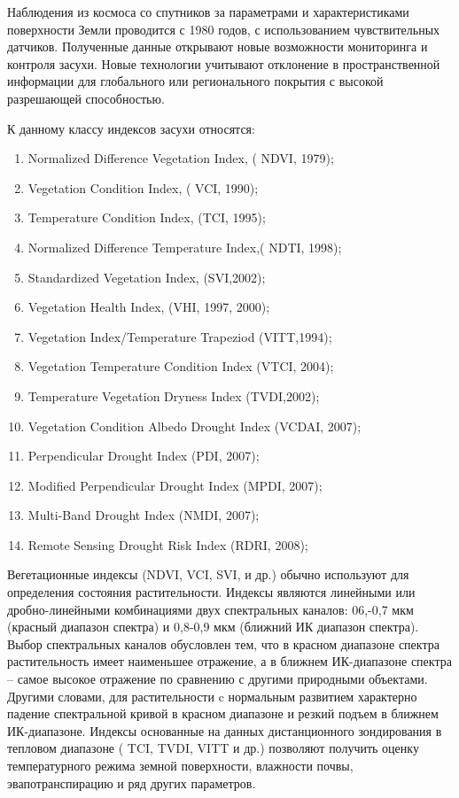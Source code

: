 Наблюдения из космоса со спутников за параметрами и характеристиками поверхности Земли проводится с 1980 годов, с использованием чувствительных датчиков. Полученные данные открывают новые возможности мониторинга и контроля засухи. Новые технологии учитывают отклонение в пространственной информации для глобального или регионального покрытия с высокой разрешающей способностью.

К данному классу индексов засухи относятся:

\begin{enumerate}
	\item Normalized Difference Vegetation Index, ( NDVI, 1979);
	\item Vegetation Condition Index, ( VCI, 1990);
	\item Temperature Condition Index, (TCI, 1995);
	\item Normalized Difference Temperature Index,( NDTI, 1998);
	\item Standardized Vegetation Index, (SVI,2002);
	\item Vegetation Health Index, (VHI, 1997, 2000);
	\item Vegetation Index/Temperature Trapeziod (VITT,1994);
	\item Vegetation Temperature Condition Index (VTCI, 2004);
	\item Temperature Vegetation Dryness Index (TVDI,2002);
	\item Vegetation Condition Albedo Drought Index (VCDAI, 2007);
	\item Perpendicular Drought Index (PDI, 2007);
	\item Modified Perpendicular Drought Index (MPDI, 2007);
	\item Multi-Band Drought Index (NMDI, 2007);
	\item Remote Sensing Drought Risk Index (RDRI, 2008);
\end{enumerate}

Вегетационные индексы (NDVI, VCI, SVI, и др.) обычно используют для определения состояния растительности. Индексы являются линейными или дробно-линейными комбинациями двух спектральных каналов: 06,-0,7 мкм (красный диапазон спектра) и 0,8-0,9 мкм (ближний ИК диапазон спектра). Выбор спектральных каналов обусловлен тем, что в красном диапазоне спектра растительность имеет наименьшее отражение, а в ближнем ИК-диапазоне спектра – самое высокое отражение по сравнению с другими природными объектами. Другими словами, для растительности c нормальным развитием характерно падение спектральной кривой в красном диапазоне и резкий подъем в ближнем ИК-диапазоне.
Индексы основанные на данных дистанционного зондирования в тепловом диапазоне ( TCI, TVDI, VITT и др.) позволяют получить оценку температурного режима земной поверхности, влажности почвы, эвапотранспирацию и ряд других параметров.

